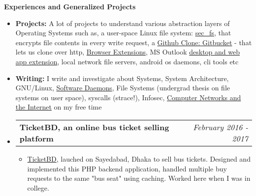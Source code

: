 \documentclass[legalpaper,10pt]{article}
\makeatletter
\newcommand{\resheading}[1]{{\large \colorbox{mygrey}{\begin{minipage}{\textwidth}{\textbf{#1 \vphantom{p\^{E}}}}\end{minipage}}}}
\newcommand{\ressubheading}[4]{
	\begin{tabular*}{7.1in}{l@{\extracolsep{\fill}}r}
		\textbf{#1} & \textit{#4} \\
	\end{tabular*}\vspace{-6pt}}
\makeatother
\begin{document}
	\vspace{0.20in}
	
	\resheading{Experiences and Generalized Projects}
	\begin{itemize}  
	    \item \textbf{Projects:} A lot of projects to understand various abstraction layers of Operating Systems such as, a user-space Linux file system: \href{https://github.com/ovebepari/sec\_fs}{sec\_fs}, that encrypts file contents in every write request, a  \href{https://github.com/ovebepari/Github_Clone}{Github Clone: Gitbucket} - that lets us clone over http, \href{https://github.com/ovebepari/Youtube-Research-Mode}{Browser Extensions}, MS Outlook \href{https://github.com/ovebepari/PhishMe}{desktop and web app extension}, local network file servers, android os daemons, cli tools etc
		
	    \vspace{0.03in}

		\item \textbf{Writing:} I write and investigate about Systems, System Architecture, GNU/Linux, \href{https://ovebepari.github.io/linux\%7Csystems/docker-socket-tale/}{Software Daemons}, File Systems (undergrad thesis on file systems on user space), syscalls (strace!), Infosec, \href{https://ovebepari.github.io/Computer-Networking-Series/}{Computer Networks and the Internet} on my free time
		
		\vspace{0.03in}
		\item \ressubheading{TicketBD, an online bus ticket selling platform}{}{}{February 2016 - 2017}
		\begin{itemize} 
			\item \href{https://www.facebook.com/ticketbd.online}{TicketBD}, lauched on Sayedabad, Dhaka to sell bus tickets. Designed and implemented this PHP backend application, handled multiple buy requests to the same "bus seat" using caching. Worked here when I was in college.
		\end{itemize}

	\end{itemize}

	\vspace{0.20in}
	
\end{document}
